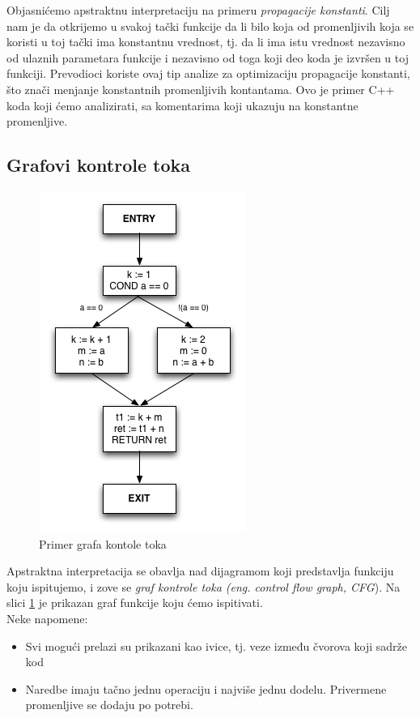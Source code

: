 Objasnićemo apstraktnu interpretaciju na primeru \emph{propagacije konstanti}. 
Cilj nam je da otkrijemo u svakoj tački funkcije da li bilo koja od promenljivih koja se koristi u toj tački ima konstantnu vrednost, tj. da li ima istu vrednost nezavisno od ulaznih parametara funkcije i nezavisno od toga koji deo koda je izvršen u toj funkciji. 
Prevodioci koriste ovaj tip analize za optimizaciju propagacije konstanti, što znači menjanje konstantnih promenljivih kontantama. 
Ovo je primer C++ koda koji ćemo analizirati, sa komentarima koji ukazuju na konstantne promenljive.


\subsection{Grafovi kontrole toka}
\label{subsec:cfgs}

\begin{figure}
\begin{center}
\includegraphics[scale=0.5]{Treehydra-cfg.png}
\end{center}
\caption{Primer grafa kontole toka}
\label{fig:graf}
\end{figure}

Apstraktna interpretacija se obavlja nad dijagramom koji predstavlja funkciju koju ispitujemo, i zove se \emph{graf kontrole toka (eng. control flow graph, CFG}). Na slici \ref{fig:graf} je prikazan graf funkcije koju ćemo ispitivati. \\
Neke napomene:
\begin{itemize}
\item Svi mogući prelazi su prikazani kao ivice, tj. veze između čvorova koji sadrže kod
\item Naredbe imaju tačno jednu operaciju i najviše jednu dodelu. Privermene promenljive se dodaju po potrebi.
\end{itemize}

